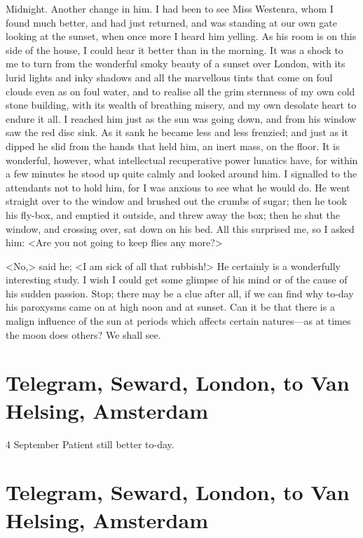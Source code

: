  
\begin{diary}{Midnight.}
Another change in him. I had been to see Miss Westenra, whom I found much better, and had just returned, and was standing at our own gate looking at the sunset, when once more I heard him yelling. As his room is on this side of the house, I could hear it better than in the morning. It was a shock to me to turn from the wonderful smoky beauty of a sunset over London, with its lurid lights and inky shadows and all the marvellous tints that come on foul clouds even as on foul water, and to realise all the grim sternness of my own cold stone building, with its wealth of breathing misery, and my own desolate heart to endure it all. I reached him just as the sun was going down, and from his window saw the red disc sink. As it sank he became less and less frenzied; and just as it dipped he slid from the hands that held him, an inert mass, on the floor. It is wonderful, however, what intellectual recuperative power lunatics have, for within a few minutes he stood up quite calmly and looked around him. I signalled to the attendants not to hold him, for I was anxious to see what he would do. He went straight over to the window and brushed out the crumbs of sugar; then he took his fly-box, and emptied it outside, and threw away the box; then he shut the window, and crossing over, sat down on his bed. All this surprised me, so I asked him: <Are you not going to keep flies any more?>

<No,> said he; <I am sick of all that rubbish!> He certainly is a wonderfully interesting study. I wish I could get some glimpse of his mind or of the cause of his sudden passion. Stop; there may be a clue after all, if we can find why to-day his paroxysms came on at high noon and at sunset. Can it be that there is a malign influence of the sun at periods which affects certain natures—as at times the moon does others? We shall see.
\end{diary}

\section{Telegram, Seward, London, to Van Helsing, Amsterdam}

\begin{telegram}{4 September}
Patient still better to-day.
\end{telegram}

\section{Telegram, Seward, London, to Van Helsing, Amsterdam}

